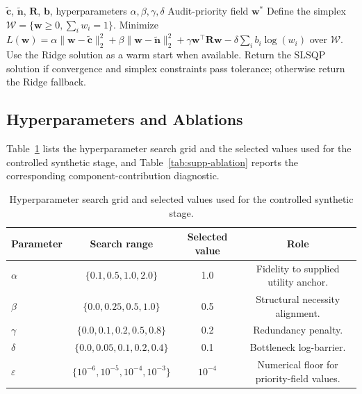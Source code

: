 \documentclass[a4paper,fleqn]{cas-sc}
\begin{document}
\begin{algorithm}[ht]
\caption{SC-FMA QP Calibration}
\label{alg:supp-scfma-qp}
\begin{algorithmic}[1]
\Require $\tilde{\mathbf{c}}$, $\tilde{\mathbf{n}}$, $\mathbf{R}$, $\mathbf{b}$, hyperparameters $\alpha,\beta,\gamma,\delta$
\Ensure Audit-priority field $\mathbf{w}^*$
\State Define the simplex $\mathcal{W}=\{\mathbf{w}\ge 0,\sum_i w_i=1\}$.
\State Minimize $L(\mathbf{w})=\alpha\|\mathbf{w}-\tilde{\mathbf{c}}\|_2^2+\beta\|\mathbf{w}-\tilde{\mathbf{n}}\|_2^2+\gamma\mathbf{w}^\top\mathbf{R}\mathbf{w}-\delta\sum_i b_i\log(w_i)$ over $\mathcal{W}$.
\State Use the Ridge solution as a warm start when available.
\State Return the SLSQP solution if convergence and simplex constraints pass tolerance; otherwise return the Ridge fallback.
\end{algorithmic}
\end{algorithm}

\subsection{Hyperparameters and Ablations}
\label{app:hyperparameters-ablation}

Table~\ref{tab:supp-hyperparameters} lists the hyperparameter search grid and the selected values used for the controlled synthetic stage, and Table~\ref{tab:supp-ablation} reports the corresponding component-contribution diagnostic.

\begin{table}[ht]
\caption{Hyperparameter search grid and selected values used for the controlled synthetic stage.}
\label{tab:supp-hyperparameters}
\centering
\small
\begin{tabular}{lccc}
\toprule
\textbf{Parameter} & \textbf{Search range} & \textbf{Selected value} & \textbf{Role} \\
\midrule
$\alpha$ & $\{0.1,0.5,1.0,2.0\}$ & 1.0 & Fidelity to supplied utility anchor. \\
$\beta$ & $\{0.0,0.25,0.5,1.0\}$ & 0.5 & Structural necessity alignment. \\
$\gamma$ & $\{0.0,0.1,0.2,0.5,0.8\}$ & 0.2 & Redundancy penalty. \\
$\delta$ & $\{0.0,0.05,0.1,0.2,0.4\}$ & 0.1 & Bottleneck log-barrier. \\
$\varepsilon$ & $\{10^{-6},10^{-5},10^{-4},10^{-3}\}$ & $10^{-4}$ & Numerical floor for priority-field values. \\
\bottomrule
\end{tabular}
\end{table}
\end{document}
